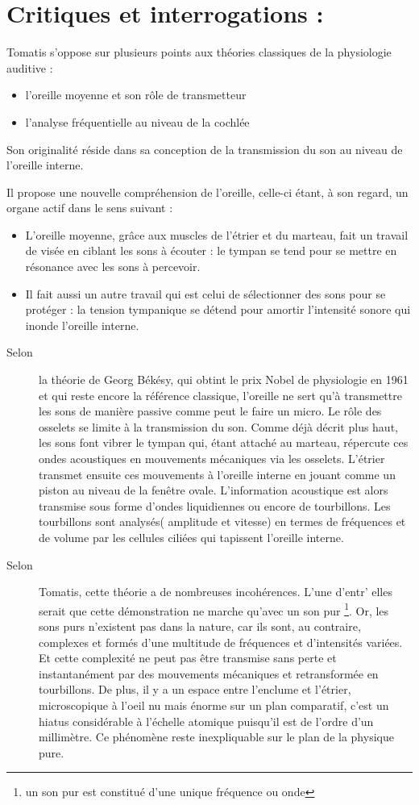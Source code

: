 \section{Critiques et interrogations :}

Tomatis s'oppose sur plusieurs points aux théories classiques de la
physiologie auditive : 
\begin{itemize}
\item l'oreille moyenne et son rôle de transmetteur 
\item l'analyse fréquentielle au niveau de la cochlée
\end{itemize}
Son originalité réside dans sa conception de la transmission du son
au niveau de l'oreille interne. 

Il propose une nouvelle compréhension de l'oreille, celle-ci étant,
à son regard, un organe actif dans le sens suivant :
\begin{itemize}
\item L'oreille moyenne, grâce aux muscles de l'étrier et du marteau, fait
un travail de visée en ciblant les sons à écouter : le tympan se tend
pour se mettre en résonance avec les sons à percevoir.
\item Il fait aussi un autre travail qui est celui de sélectionner des sons
pour se protéger : la tension tympanique se détend pour amortir l'intensité
sonore qui inonde l'oreille interne. 
\end{itemize}
\begin{description}
\item [{Selon}] la théorie de Georg Békésy, qui obtint le prix Nobel de
physiologie en 1961 et qui reste encore la référence classique, l'oreille
ne sert qu'à transmettre les sons de manière passive comme peut le
faire un micro. Le rôle des osselets se limite à la transmission du
son. Comme déjà décrit plus haut, les sons font vibrer le tympan qui,
étant attaché au marteau, répercute ces ondes acoustiques en mouvements
mécaniques via les osselets. L'étrier transmet ensuite ces mouvements
à l'oreille interne en jouant comme un piston au niveau de la fenêtre
ovale. L'information acoustique est alors transmise sous forme d'ondes
liquidiennes ou encore de tourbillons. Les tourbillons sont analysés(
amplitude et vitesse) en termes de fréquences et de volume par les
cellules ciliées qui tapissent l'oreille interne. 
\item [{Selon}] Tomatis, cette théorie a de nombreuses incohérences. L'une
d'entr' elles serait que cette démonstration ne marche qu'avec un
son pur \footnote{un son pur est constitué d'une unique fréquence ou onde}.
Or, les sons purs n'existent pas dans la nature, car ils sont, au
contraire, complexes et formés d'une multitude de fréquences et d'intensités
variées. Et cette complexité ne peut pas être transmise sans perte
et instantanément par des mouvements mécaniques et retransformée en
tourbillons. De plus, il y a un espace entre l'enclume et l'étrier,
microscopique à l'oeil nu mais énorme sur un plan comparatif, c'est
un hiatus considérable à l'échelle atomique puisqu'il est de l'ordre
d'un millimètre. Ce phénomène reste inexpliquable sur le plan de la
physique pure.
\end{description}
